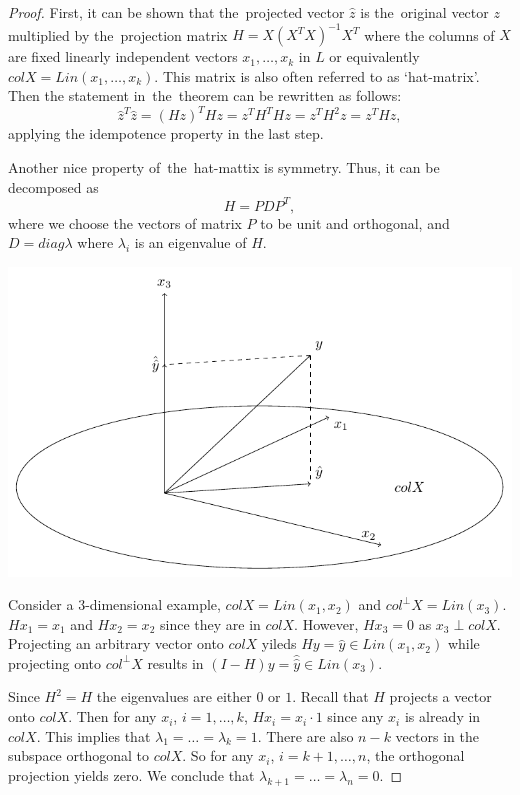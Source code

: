 \begin{proof}
First, it can be shown that the~projected vector $\hat z$ is the~original vector $z$
multiplied by the~projection matrix $H = X(X^T X)^{-1}X^T$ where the columns of $X$
are fixed linearly independent vectors $x_1, \ldots, x_k$ in $L$
or equivalently $colX = Lin(x_1, \ldots, x_k)$.
This matrix is  also often referred to as `hat-matrix'.
Then the statement in~the~theorem can be rewritten as follows:
\[
\hat z^T \hat z = (Hz)^T Hz = z^T H^T H z = z^T H^2 z = z^T H z,
\]
applying the idempotence property in the last step.

Another nice property of~the~hat-mattix is symmetry.
Thus, it can be decomposed as
\[
H = P D P^T,
\]
where we choose the vectors of matrix $P$ to be unit and orthogonal,
and $D = diag{\lambda}$ where $\lambda_i$ is an eigenvalue of $H$.

\begin{marginfigure}
  \includegraphics[width=\linewidth]{figures/04_chi_squared_example.pdf}
  \caption{Consider a $3$-dimensional example, $colX = Lin(x_1, x_2)$ and $col^{\perp}X = Lin(x_3)$.
  $H x_1 = x_1$ and $H x_2 = x_2$ since they are in $colX$. However, $H x_3 = 0$ as $x_3 \perp colX$.
  Projecting an arbitrary vector onto $colX$ yileds $Hy = \hat y \in Lin(x_1, x_2)$
  while projecting onto $col^{\perp}X$ results in $(I-H)y = \hat{\hat y} \in Lin(x_3)$.}
\end{marginfigure}

Since $H^2 = H$ the eigenvalues are either $0$ or $1$.
Recall that $H$ projects a vector onto $colX$.
Then for any $x_i$, $i = 1, \ldots, k$, $H x_i = x_i \cdot 1$ since
any $x_i$ is already in $colX$. This implies that $\lambda_1 = \ldots = \lambda_k = 1$.
There are also $n-k$ vectors in the subspace orthogonal to $colX$.
So for any $x_i$, $i= k+1, \ldots, n$, the orthogonal projection yields zero.
We conclude that $\lambda_{k+1} = \ldots = \lambda_n = 0$.


\end{proof}
